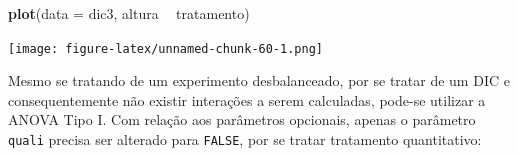 \documentclass[
]{article}
\newenvironment{Shaded}{\begin{snugshade}}{\end{snugshade}}
\newcommand{\DataTypeTok}[1]{\textcolor[rgb]{0.13,0.29,0.53}{#1}}
\newcommand{\KeywordTok}[1]{\textcolor[rgb]{0.13,0.29,0.53}{\textbf{#1}}}
\newcommand{\NormalTok}[1]{#1}
\newcommand{\OperatorTok}[1]{\textcolor[rgb]{0.81,0.36,0.00}{\textbf{#1}}}
\newcommand{\OtherTok}[1]{\textcolor[rgb]{0.56,0.35,0.01}{#1}}
\newcommand{\StringTok}[1]{\textcolor[rgb]{0.31,0.60,0.02}{#1}}
\begin{document}
\begin{Shaded}
\begin{Highlighting}[]
\KeywordTok{plot}\NormalTok{(}\DataTypeTok{data =}\NormalTok{ dic3, altura }\OperatorTok{~}\StringTok{ }\NormalTok{tratamento)}
\end{Highlighting}
\end{Shaded}

\texttt{[image: figure-latex/unnamed-chunk-60-1.png]}

Mesmo se tratando de um experimento desbalanceado, por se tratar de um DIC e consequentemente não existir interações a serem calculadas, pode-se utilizar a ANOVA Tipo I. Com relação aos parâmetros opcionais, apenas o parâmetro \texttt{quali} precisa ser alterado para \texttt{FALSE}, por se tratar tratamento quantitativo:

\begin{Shaded}
\end{Shaded}
\end{document}
